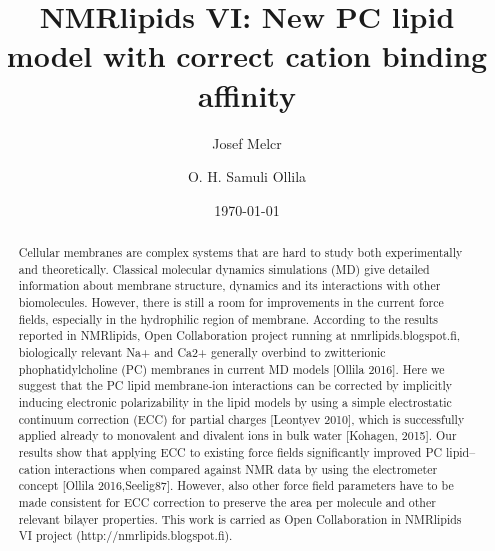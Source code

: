 \documentclass[aps,prl,superscriptaddress,twocolumn]{revtex4}
\begin{document}

\title{NMRlipids VI: New PC lipid model with correct cation binding affinity} %



\author{Josef Melcr}

\author{O. H. Samuli Ollila}



\date{\today}

\begin{abstract}
  Cellular membranes are complex systems that are hard to study both experimentally and theoretically. Classical molecular dynamics simulations (MD)
give detailed information about membrane structure, dynamics and its interactions with other biomolecules. However,  there is still a room for
improvements in the current force fields, especially in the hydrophilic region of membrane.  According to the results reported in NMRlipids, Open Collaboration project
running at nmrlipids.blogspot.fi, biologically relevant Na+ and Ca2+ generally overbind to zwitterionic phophatidylcholine (PC) membranes in current MD models [Ollila 2016].
Here we suggest that the PC lipid membrane-ion interactions can be corrected by implicitly inducing electronic polarizability in the lipid models by
using a simple electrostatic continuum correction (ECC) for partial charges [Leontyev 2010], which is successfully applied already to monovalent and divalent ions in bulk water [Kohagen, 2015].
Our results show that applying ECC to existing force fields significantly improved PC lipid--cation interactions when compared against NMR data
by using the electrometer concept [Ollila 2016,Seelig87]. However, also other force field parameters have to be made consistent
for ECC correction to preserve the area per molecule and other relevant bilayer properties. This work is carried as Open Collaboration
in NMRlipids VI project (http://nmrlipids.blogspot.fi).
\end{abstract}
\end{document}
